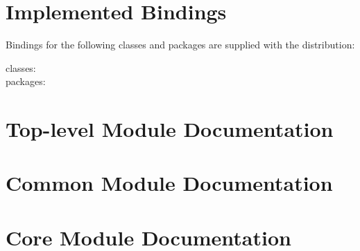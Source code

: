 \documentclass{book}
\begin{document}
\chapter[Bindings]{Implemented Bindings}\label{included.bindings}
Bindings for the following classes and packages are supplied with the distribution:
\begin{description}
\item[classes:] \CurrentClasses
\item[packages:] \CurrentPackages
\end{description}

\chapter[Modules]{Top-level Module Documentation}\label{modules}





\chapter[Common Modules]{Common Module Documentation}\label{commonmodules}





















\chapter[Core Modules]{Core Module Documentation}\label{coremodules}
\end{document}
